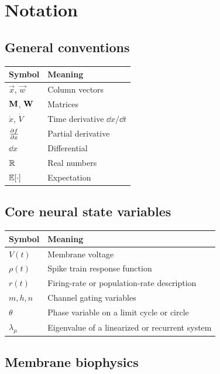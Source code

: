 \chapter*{Notation}

\section*{General conventions}

\begin{tabular}{@{}ll@{}}
  \toprule
  \textbf{Symbol} & \textbf{Meaning} \\
  \midrule
  $\vec{x}$, $\vec{w}$ & Column vectors \\
  $\mathbf{M}$, $\mathbf{W}$ & Matrices \\
  $\dot{x}$, $\dot{V}$ & Time derivative $\dd x / \dd t$ \\
  $\frac{\partial f}{\partial x}$ & Partial derivative \\
  $\dd x$ & Differential \\
  $\mathbb{R}$ & Real numbers \\
  $\mathbb{E}[\cdot]$ & Expectation \\
  \bottomrule
\end{tabular}

\section*{Core neural state variables}

\begin{tabular}{@{}ll@{}}
  \toprule
  \textbf{Symbol} & \textbf{Meaning} \\
  \midrule
  $V(t)$ & Membrane voltage \\
  $\rho(t)$ & Spike train response function \\
  $r(t)$ & Firing-rate or population-rate description \\
  $m,h,n$ & Channel gating variables \\
  $\theta$ & Phase variable on a limit cycle or circle \\
  $\lambda_\mu$ & Eigenvalue of a linearized or recurrent system \\
  \bottomrule
\end{tabular}

\section*{Membrane biophysics}

